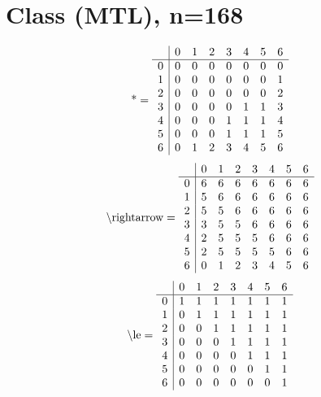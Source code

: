\documentclass[11pt]{article}
\begin{document}
\section{Class (MTL), n=168}
\[\text{*} = 
\begin{array}{r | r r r r r r r}
 & 0 & 1 & 2 & 3 & 4 & 5 & 6 \\ \hline
0 & 0 & 0 & 0 & 0 & 0 & 0 & 0 \\
1 & 0 & 0 & 0 & 0 & 0 & 0 & 1 \\
2 & 0 & 0 & 0 & 0 & 0 & 0 & 2 \\
3 & 0 & 0 & 0 & 0 & 1 & 1 & 3 \\
4 & 0 & 0 & 0 & 1 & 1 & 1 & 4 \\
5 & 0 & 0 & 0 & 1 & 1 & 1 & 5 \\
6 & 0 & 1 & 2 & 3 & 4 & 5 & 6 \\
\end{array}
\]
\[\text{\textbackslash rightarrow} = 
\begin{array}{r | r r r r r r r}
 & 0 & 1 & 2 & 3 & 4 & 5 & 6 \\ \hline
0 & 6 & 6 & 6 & 6 & 6 & 6 & 6 \\
1 & 5 & 6 & 6 & 6 & 6 & 6 & 6 \\
2 & 5 & 5 & 6 & 6 & 6 & 6 & 6 \\
3 & 3 & 5 & 5 & 6 & 6 & 6 & 6 \\
4 & 2 & 5 & 5 & 5 & 6 & 6 & 6 \\
5 & 2 & 5 & 5 & 5 & 5 & 6 & 6 \\
6 & 0 & 1 & 2 & 3 & 4 & 5 & 6 \\
\end{array}
\]
\[\text{\textbackslash le} = 
\begin{array}{r | r r r r r r r}
 & 0 & 1 & 2 & 3 & 4 & 5 & 6 \\ \hline
0 & 1 & 1 & 1 & 1 & 1 & 1 & 1 \\
1 & 0 & 1 & 1 & 1 & 1 & 1 & 1 \\
2 & 0 & 0 & 1 & 1 & 1 & 1 & 1 \\
3 & 0 & 0 & 0 & 1 & 1 & 1 & 1 \\
4 & 0 & 0 & 0 & 0 & 1 & 1 & 1 \\
5 & 0 & 0 & 0 & 0 & 0 & 1 & 1 \\
6 & 0 & 0 & 0 & 0 & 0 & 0 & 1 \\
\end{array}
\]
\end{document}
